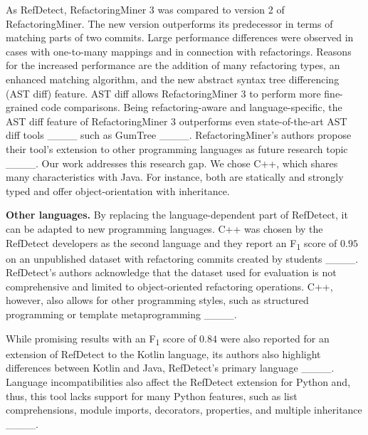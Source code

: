 As RefDetect, RefactoringMiner 3 was compared to version 2 of RefactoringMiner. The new version outperforms its predecessor in terms of matching parts of two commits. Large performance differences were observed in cases with one-to-many mappings and in connection with refactorings. Reasons for the increased performance are the addition of many refactoring types, an enhanced matching algorithm, and the new abstract syntax tree differencing (AST diff) feature. AST diff allows RefactoringMiner 3 to perform more fine-grained code comparisons. Being refactoring-aware and language-specific, the AST diff feature of RefactoringMiner 3 outperforms even state-of-the-art AST diff tools ____ such as GumTree ____. RefactoringMiner's authors propose their tool's extension to other programming languages as future research topic ____. Our work addresses this research gap. We chose C++, which shares many characteristics with Java. For instance, both are statically and strongly typed and offer object-orientation with inheritance.

\noindent\textbf{Other languages.} By replacing the language-dependent part of RefDetect, it can be adapted to new programming languages. C++ was chosen by the RefDetect developers as the second language and they report an F\textsubscript{1} score of $0.95$ on an unpublished dataset with refactoring commits created %
by students ____. RefDetect's authors acknowledge that the dataset used for evaluation is not comprehensive and limited to object-oriented refactoring operations. C++, however, also allows for other programming styles, such as structured programming or template metaprogramming ____.

While promising results with an F\textsubscript{1} score of $0.84$ were also reported for an extension of RefDetect to the Kotlin language, its authors also highlight differences between Kotlin and Java, RefDetect's primary language ____. Language incompatibilities also affect the RefDetect extension for Python and, thus, this tool lacks support for many Python features, such as list comprehensions, module imports, decorators, properties, and multiple inheritance ____.

